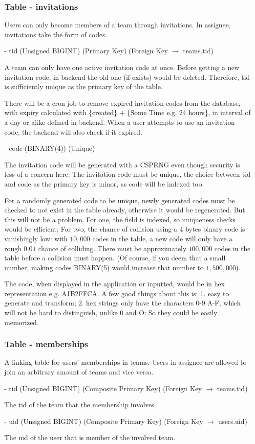 \documentclass[12pt]{report}
\newcommand{\n}{\par}
\newcommand{\br}{\n\vspace{1 em}\n}
\begin{document}
\subsubsection{Table - invitations} \label{data-layer.design.team-system.invitations}
Users can only become members of a team through invitations.
In assignee, invitations take the form of codes.
\br
- tid (Unsigned BIGINT) (Primary Key) (Foreign Key $\rightarrow$ teams.tid)\n
A team can only have one active invitation code at once.
Before getting a new invitation code, in backend the old one (if exists) would be deleted.
Therefore, tid is sufficiently unique as the primary key of the table.\n
There will be a cron job to remove expired invitation codes from the database,
with expiry calculated with \{created\} + \{Some Time e.g. 24 hours\},
in interval of a day or alike defined in backend.
When a user attempts to use an invitation code, the backend will also check if it expired.\n
\br
- code (BINARY(4)) (Unique)\n
The invitation code will be generated with a CSPRNG even though security is less of a concern here.
The invitation code must be unique, the choice between tid and code as the primary key is minor,
as code will be indexed too.\n
For a randomly generated code to be unique, newly generated codes must be checked to not exist in the table already,
otherwise it would be regenerated. But this will not be a problem.
For one, the field is indexed, so uniqueness checks would be efficient;
For two, the chance of collision using a 4 bytes binary code is vanishingly low:
with $10,000$ codes in the table, a new code will only have a rough $0.01$ chance of colliding.
There must be approximately $100,000$ codes in the table before a collision must happen.
(Of course, if you deem that a small number,
making codes BINARY(5) would increase that number to $1,500,000$).\n
The code, when displayed in the application or inputted,
would be in hex representation e.g. A1B2FFCA.
A few good things about this is: 1. easy to generate and transform;
2. hex strings only have the characters 0-9 A-F, which will not be hard to distinguish, unlike 0 and O;
So they could be easily memorized.

\subsubsection{Table - memberships} \label{data-layer.design.team-system.memberships}
A linking table for users' memberships in teams.
Users in assignee are allowed to join an arbitrary amount of teams and vice versa.
\br
- tid (Unsigned BIGINT) (Composite Primary Key) (Foreign Key $\rightarrow$ teams.tid)\n
The tid of the team that the membership involves.
\br
- uid (Unsigned BIGINT) (Composite Primary Key) (Foreign Key $\rightarrow$ users.uid)\n
The uid of the user that is member of the involved team.
\end{document}
